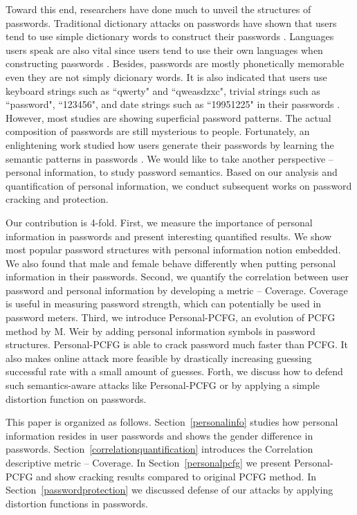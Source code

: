 Toward this end, researchers have done much to unveil the structures of passwords. Traditional dictionary attacks on passwords have shown that users tend to use simple dictionary words to construct their passwords \cite{hellman1980cryptanalytic}\cite{morris1979password}. Languages users speak are also vital since users tend to use their own languages when constructing passwords \cite{bonneau2012science}. Besides, passwords are mostly phonetically memorable \cite{narayanan2005fast} even they are not simply dicionary words. It is also indicated that users use keyboard strings such as ``qwerty" and ``qweasdzxc", trivial strings such as ``password", ``123456", and date strings such as ``19951225" in their passwords \cite{li2014large}\cite{schweitzer2009visualizing}\cite{veras2012visualizing}. However, most studies are showing superficial password patterns. The actual composition of passwords are still mysterious to people. Fortunately, an enlightening work studied how users generate their passwords by learning the semantic patterns in passwords \cite{veras2014semantic}. We would like to take another perspective -- personal information, to study password semantics. Based on our analysis and quantification of personal information, we conduct subsequent works on password cracking and protection. 

Our contribution is 4-fold. First, we measure the importance of personal information in passwords and present interesting quantified results. We show most popular password structures with personal information notion embedded. We also found that male and female behave differently when putting personal information in their passwords. Second, we quantify the correlation between user password and personal information by developing a metric -- Coverage. Coverage is useful in measuring password strength, which can potentially be used in password meters. Third, we introduce Personal-PCFG, an evolution of PCFG method by M. Weir\cite{weir2009password} by adding personal information symbols in password structures. Personal-PCFG is able to crack password much faster than PCFG. It also makes online attack more feasible by drastically increasing guessing successful rate with a small amount of guesses. Forth, we discuss how to defend such semantics-aware attacks like Personal-PCFG or \cite{veras2014semantic} by applying a simple distortion function on passwords. 

This paper is organized as follows. Section~\ref{personalinfo} studies how personal information resides in user passwords and shows the gender difference in passwords. Section~\ref{correlationquantification} introduces the Correlation descriptive metric -- Coverage. In Section~\ref{personalpcfg} we present Personal-PCFG and show cracking results compared to original PCFG method. In Section~\ref{passwordprotection} we discussed defense of our attacks by applying distortion functions in passwords.
